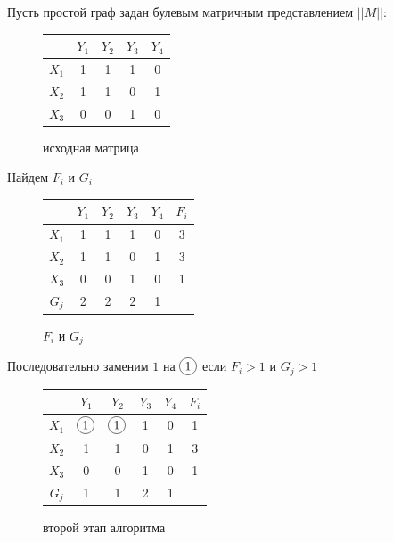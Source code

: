 \documentclass[12pt]{article}
\newcommand*\circled[1]{\tikz[baseline=(char.base)]{
            \node[shape=circle,draw,inner sep=2pt] (char) {#1};}}
\begin{document}
Пусть простой граф задан булевым матричным представлением $||M||$:

\begin{figure}[H]
    \centering
    \begin{tabular}{ c|c|c|c|c| }
              & $Y_1$ & $Y_2$ & $Y_3$ & $Y_4$ \\
        \hline
        $X_1$ & 1     & 1     & 1     & 0     \\
        \hline
        $X_2$ & 1     & 1     & 0     & 1     \\
        \hline
        $X_3$ & 0     & 0     & 1     & 0     \\
        \hline
    \end{tabular}
    \label{fig:table1}
    \caption{исходная матрица}
\end{figure}

Найдем $F_i$ и $G_i$

\begin{figure}[H]
    \centering
    \begin{tabular}{ c|c|c|c|c|c }
              & $Y_1$ & $Y_2$ & $Y_3$ & $Y_4$ & $F_i$ \\
        \hline
        $X_1$ & 1     & 1     & 1     & 0     & 3     \\
        \hline
        $X_2$ & 1     & 1     & 0     & 1     & 3     \\
        \hline
        $X_3$ & 0     & 0     & 1     & 0     & 1     \\
        \hline
        $G_j$ & 2     & 2     & 2     & 1     &
    \end{tabular}
    \label{fig:FiGj}
    \caption{$F_i$ и $G_j$}
\end{figure}

Последовательно заменим $1$ на $\circled{1}$ если $F_i > 1$ и $G_j > 1$

\begin{figure}[H]
    \centering
    \begin{tabular}{ c|c|c|c|c|c }
              & $Y_1$         & $Y_2$         & $Y_3$ & $Y_4$ & $F_i$ \\
        \hline
        $X_1$ & $\circled{1}$ & $\circled{1}$ & 1     & 0     & 1     \\
        \hline
        $X_2$ & 1             & 1             & 0     & 1     & 3     \\
        \hline
        $X_3$ & 0             & 0             & 1     & 0     & 1     \\
        \hline
        $G_j$ & 1             & 1             & 2     & 1     &
    \end{tabular}
    \label{fig:second_step_complete}
    \caption{второй этап алгоритма}
\end{figure}
\end{document}
